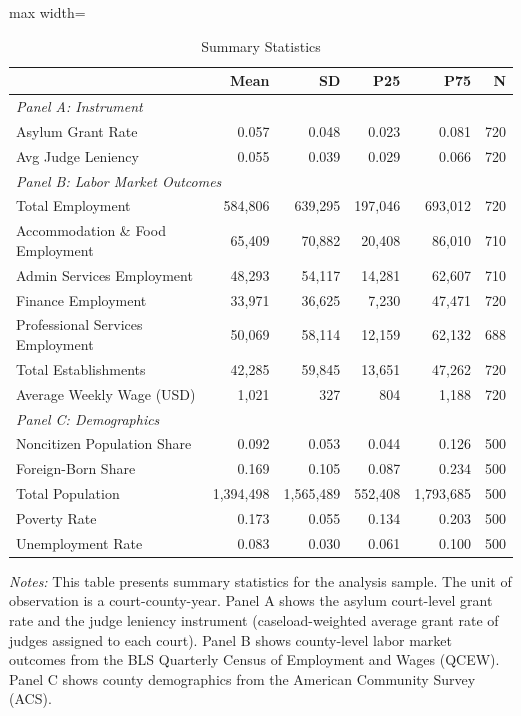 \begin{table}[htbp]
\centering
\caption{Summary Statistics}
\label{tab:summary}
\begin{adjustbox}{max width=\textwidth}
\begin{tabular}{lrrrrr}
\toprule
 & Mean & SD & P25 & P75 & N \\
\midrule
\multicolumn{6}{l}{\textit{Panel A: Instrument}} \\
Asylum Grant Rate & 0.057 & 0.048 & 0.023 & 0.081 & 720 \\
Avg Judge Leniency & 0.055 & 0.039 & 0.029 & 0.066 & 720 \\
\midrule
\multicolumn{6}{l}{\textit{Panel B: Labor Market Outcomes}} \\
Total Employment &   584,806 &   639,295 & 197,046 &   693,012 & 720 \\
Accommodation \& Food Employment &    65,409 &    70,882 &  20,408 &    86,010 & 710 \\
Admin Services Employment &    48,293 &    54,117 &  14,281 &    62,607 & 710 \\
Finance Employment &    33,971 &    36,625 &   7,230 &    47,471 & 720 \\
Professional Services Employment &    50,069 &    58,114 &  12,159 &    62,132 & 688 \\
Total Establishments &    42,285 &    59,845 &  13,651 &    47,262 & 720 \\
Average Weekly Wage (USD) &     1,021 &       327 &     804 &     1,188 & 720 \\
\midrule
\multicolumn{6}{l}{\textit{Panel C: Demographics}} \\
Noncitizen Population Share & 0.092 & 0.053 & 0.044 & 0.126 & 500 \\
Foreign-Born Share & 0.169 & 0.105 & 0.087 & 0.234 & 500 \\
Total Population & 1,394,498 & 1,565,489 & 552,408 & 1,793,685 & 500 \\
Poverty Rate & 0.173 & 0.055 & 0.134 & 0.203 & 500 \\
Unemployment Rate & 0.083 & 0.030 & 0.061 & 0.100 & 500 \\
\bottomrule
\end{tabular}
\end{adjustbox}
\begin{minipage}{0.9\textwidth}
\vspace{0.5em}
\footnotesize \textit{Notes:} This table presents summary statistics for the analysis sample.
The unit of observation is a court-county-year. Panel A shows the asylum court-level grant rate
and the judge leniency instrument (caseload-weighted average grant rate of judges assigned to each court).
Panel B shows county-level labor market outcomes from the BLS Quarterly Census of Employment and Wages (QCEW).
Panel C shows county demographics from the American Community Survey (ACS).
\end{minipage}
\end{table}

